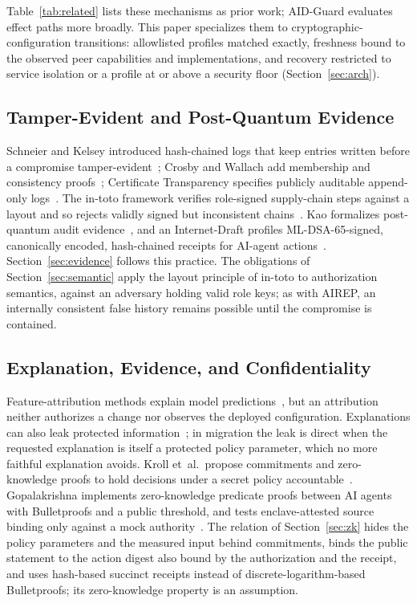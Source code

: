 \documentclass[journal]{IEEEtran}
\begin{document}
Table~\ref{tab:related} lists these mechanisms as prior work; AID-Guard evaluates effect paths more broadly. This paper specializes them to cryptographic-configuration transitions: allowlisted profiles matched exactly, freshness bound to the observed peer capabilities and implementations, and recovery restricted to service isolation or a profile at or above a security floor (Section~\ref{sec:arch}).

\subsection{Tamper-Evident and Post-Quantum Evidence}
Schneier and Kelsey introduced hash-chained logs that keep entries written before a compromise tamper-evident~\cite{schneier}; Crosby and Wallach add membership and consistency proofs~\cite{crosby}; Certificate Transparency specifies publicly auditable append-only logs~\cite{ct}. The in-toto framework verifies role-signed supply-chain steps against a layout and so rejects validly signed but inconsistent chains~\cite{intoto}. Kao formalizes post-quantum audit evidence~\cite{kao}, and an Internet-Draft profiles ML-DSA-65-signed, canonically encoded, hash-chained receipts for AI-agent actions~\cite{asqav}. Section~\ref{sec:evidence} follows this practice. The obligations of Section~\ref{sec:semantic} apply the layout principle of in-toto to authorization semantics, against an adversary holding valid role keys; as with AIREP, an internally consistent false history remains possible until the compromise is contained.

\subsection{Explanation, Evidence, and Confidentiality}
Feature-attribution methods explain model predictions~\cite{shap,lime}, but an attribution neither authorizes a change nor observes the deployed configuration. Explanations can also leak protected information~\cite{shokri}; in migration the leak is direct when the requested explanation is itself a protected policy parameter, which no more faithful explanation avoids. Kroll et~al.\ propose commitments and zero-knowledge proofs to hold decisions under a secret policy accountable~\cite{kroll}. Gopalakrishna implements zero-knowledge predicate proofs between AI agents with Bulletproofs and a public threshold, and tests enclave-attested source binding only against a mock authority~\cite{gopalakrishna}. The relation of Section~\ref{sec:zk} hides the policy parameters and the measured input behind commitments, binds the public statement to the action digest also bound by the authorization and the receipt, and uses hash-based succinct receipts instead of discrete-logarithm-based Bulletproofs; its zero-knowledge property is an assumption.
\end{document}
